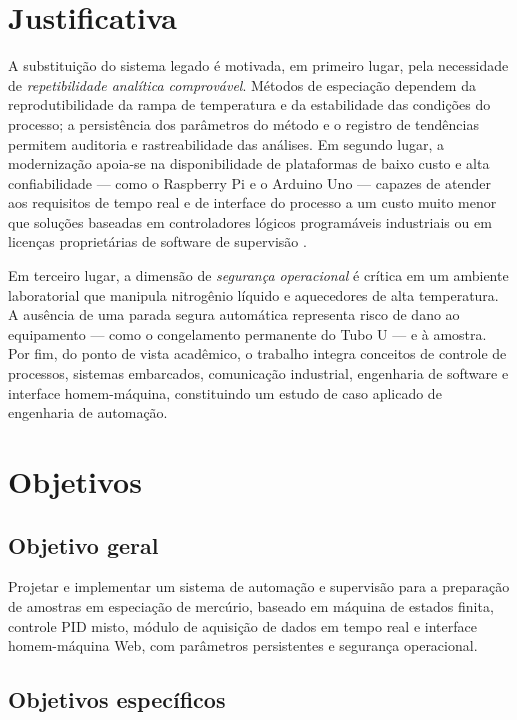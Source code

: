 \section{Justificativa}

A substituição do sistema legado é motivada, em primeiro lugar, pela necessidade
de \emph{repetibilidade analítica comprovável}. Métodos de especiação dependem
da reprodutibilidade da rampa de temperatura e da estabilidade das condições do
processo; a persistência dos parâmetros do método e o registro de tendências
permitem auditoria e rastreabilidade das análises. Em segundo lugar, a
modernização apoia-se na disponibilidade de plataformas de baixo custo e alta
confiabilidade --- como o Raspberry Pi e o Arduino Uno --- capazes de atender
aos requisitos de tempo real e de interface do processo a um custo muito menor
que soluções baseadas em controladores lógicos programáveis industriais ou em
licenças proprietárias de software de supervisão \cite{arduino, raspberrypi}.

Em terceiro lugar, a dimensão de \emph{segurança operacional} é crítica em um
ambiente laboratorial que manipula nitrogênio líquido e aquecedores de alta
temperatura. A ausência de uma parada segura automática representa risco de dano
ao equipamento --- como o congelamento permanente do Tubo U --- e à amostra.
Por fim, do ponto de vista acadêmico, o trabalho integra conceitos de controle
de processos, sistemas embarcados, comunicação industrial, engenharia de
software e interface homem-máquina, constituindo um estudo de caso aplicado de
engenharia de automação.

\section{Objetivos}

\subsection{Objetivo geral}

Projetar e implementar um sistema de automação e supervisão para a preparação de
amostras em especiação de mercúrio, baseado em máquina de estados finita,
controle PID misto, módulo de aquisição de dados em tempo real e interface
homem-máquina Web, com parâmetros persistentes e segurança operacional.

\subsection{Objetivos específicos}

